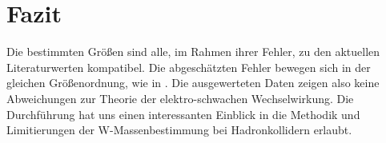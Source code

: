 \documentclass[a4paper,12pt]{article}
\begin{document}
\section{Fazit}
Die bestimmten Größen sind alle, im Rahmen ihrer Fehler, zu den aktuellen Literaturwerten kompatibel. Die abgeschätzten Fehler
bewegen sich in der gleichen Größenordnung, wie in \cite{Abachi:1996ey}. Die ausgewerteten Daten zeigen also keine Abweichungen zur Theorie der 
elektro-schwachen Wechselwirkung. Die Durchführung hat uns einen interessanten Einblick in die Methodik und Limitierungen der W-Massenbestimmung bei
Hadronkollidern erlaubt.

{}
\end{document}

